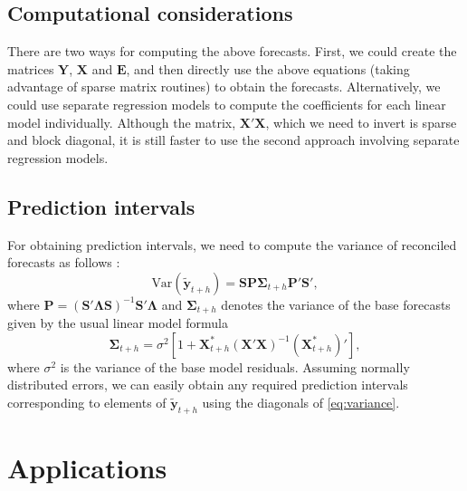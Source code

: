 \documentclass[11pt,a4paper,]{article}
\begin{document}
\hypertarget{computational-considerations}{%
\subsection{\texorpdfstring{Computational considerations \label{sec:computationalconsiderations}}{Computational considerations }}\label{computational-considerations}}

There are two ways for computing the above forecasts. First, we could create the matrices \(\bm{Y}\), \(\bm{X}\) and \(\bm{E}\), and then directly use the above equations (taking advantage of sparse matrix routines) to obtain the forecasts. Alternatively, we could use separate regression models to compute the coefficients for each linear model individually. Although the matrix, \(\bm{X}'\bm{X}\), which we need to invert is sparse and block diagonal, it is still faster to use the second approach involving separate regression models.

\hypertarget{prediction-intervals}{%
\subsection{Prediction intervals}\label{prediction-intervals}}

For obtaining prediction intervals, we need to compute the variance of reconciled forecasts as follows \autocite{mint2018}:
\begin{equation}\label{eq:variance}
    \text{Var}(\tilde{\bm{y}}_{t+h})
        = \bm{S}\bm{P}{\bm{\Sigma}_{t+h}} \bm{P}'\bm{S}',
\end{equation}
where \(\bm{P} = (\bm{S}'\bm{\Lambda}\bm{S})^{-1}\bm{S}'\bm{\Lambda}\) and \({\bm{\Sigma}_{t+h}}\) denotes the variance of the base forecasts given by the usual linear model formula \autocite{fpp2}
\[
  \bm{\Sigma}_{t+h} = \sigma^2\left[1 + \bm{X}_{t+h}^*(\bm{X}'\bm{X})^{-1}(\bm{X}_{t+h}^*)'\right],
\]
where \(\sigma^2\) is the variance of the base model residuals. Assuming normally distributed errors, we can easily obtain any required prediction intervals corresponding to elements of \(\tilde{\bm{y}}_{t+h}\) using the diagonals of \eqref{eq:variance}.

\hypertarget{applications}{%
\section{Applications}\label{applications}}
\end{document}
